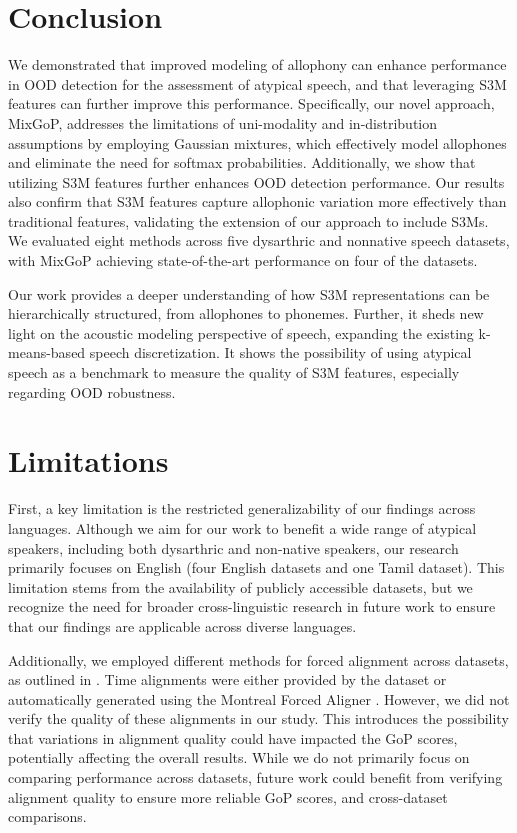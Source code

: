 \section{Conclusion}
We demonstrated that improved modeling of allophony can enhance performance in OOD detection for the assessment of atypical speech, and that leveraging S3M features can further improve this performance. 
Specifically, our novel approach, MixGoP, addresses the limitations of uni-modality and in-distribution assumptions by employing Gaussian mixtures, which effectively model allophones and eliminate the need for softmax probabilities. 
Additionally, we show that utilizing S3M features further enhances OOD detection performance. 
Our results also confirm that S3M features capture allophonic variation more effectively than traditional features, validating the extension of our approach to include S3Ms. 
We evaluated eight methods across five dysarthric and nonnative speech datasets, with MixGoP achieving state-of-the-art performance on four of the datasets.


Our work provides a deeper understanding of how S3M representations can be hierarchically structured, from allophones to phonemes.
Further, it sheds new light on the acoustic modeling perspective of speech, expanding the existing k-means-based speech discretization.
It shows the possibility of using atypical speech as a benchmark to measure the quality of S3M features, especially regarding OOD robustness.

\section*{Limitations}
First, a key limitation is the restricted generalizability of our findings across languages. Although we aim for our work to benefit a wide range of atypical speakers, including both dysarthric and non-native speakers, our research primarily focuses on English (four English datasets and one Tamil dataset). This limitation stems from the availability of publicly accessible datasets, but we recognize the need for broader cross-linguistic research in future work to ensure that our findings are applicable across diverse languages.

Additionally, we employed different methods for forced alignment across datasets, as outlined in .
Time alignments were either provided by the dataset or automatically generated using the Montreal Forced Aligner \citep{mcauliffe2017montreal}. 
However, we did not verify the quality of these alignments in our study. 
This introduces the possibility that variations in alignment quality could have impacted the GoP scores, potentially affecting the overall results.
While we do not primarily focus on comparing performance across datasets, future work could benefit from verifying alignment quality to ensure more reliable GoP scores, and cross-dataset comparisons.

